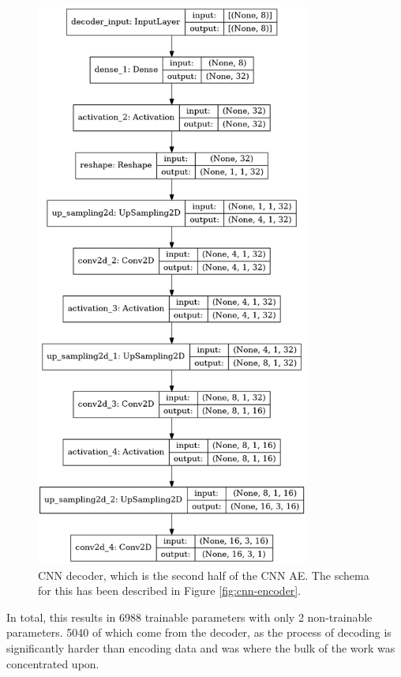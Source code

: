 \documentclass[a4paper]{article}
\theoremstyle{plain}
\theoremstyle{definition}
\begin{document}
\begin{figure}[H]
\begin{minipage}[c]{0.45\linewidth}
                        \includegraphics[width=0.8\textwidth]{decoder.png}
                        \caption{CNN decoder, which is the second half of the CNN AE. The schema for this has been described in Figure \ref{fig:cnn-encoder}.}
                        \label{fig:cnn-decoder}
                    \end{minipage}
            \end{figure}

            In total, this results in 6988 trainable parameters with only 2 non-trainable parameters. 5040 of which come from the decoder, as the process of decoding is significantly harder than encoding data and was where the bulk of the work was concentrated upon. 
\end{document}
